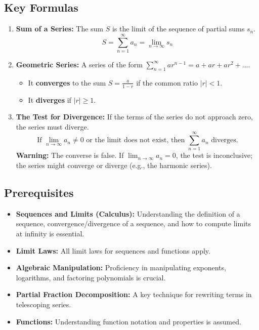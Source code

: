 \documentclass{article}
\begin{document}
\subsection{Key Formulas}
\begin{enumerate}
    \item \textbf{Sum of a Series:} The sum $S$ is the limit of the sequence of partial sums $s_n$.
    \[ S = \sum_{n=1}^{\infty} a_n = \lim_{n \to \infty} s_n \]
    \item \textbf{Geometric Series:} A series of the form $\sum_{n=1}^{\infty} ar^{n-1} = a + ar + ar^2 + \dots$.
    \begin{itemize}
        \item It \textbf{converges} to the sum $S = \frac{a}{1-r}$ if the common ratio $|r| < 1$.
        \item It \textbf{diverges} if $|r| \ge 1$.
    \end{itemize}
    \item \textbf{The Test for Divergence:} If the terms of the series do not approach zero, the series must diverge.
    \[ \text{If } \lim_{n \to \infty} a_n \neq 0 \text{ or the limit does not exist, then } \sum_{n=1}^{\infty} a_n \text{ diverges.} \]
    \textbf{Warning:} The converse is false. If $\lim_{n \to \infty} a_n = 0$, the test is inconclusive; the series might converge or diverge (e.g., the harmonic series).
\end{enumerate}

\subsection{Prerequisites}
\begin{itemize}
    \item \textbf{Sequences and Limits (Calculus):} Understanding the definition of a sequence, convergence/divergence of a sequence, and how to compute limits at infinity is essential.
    \item \textbf{Limit Laws:} All limit laws for sequences and functions apply.
    \item \textbf{Algebraic Manipulation:} Proficiency in manipulating exponents, logarithms, and factoring polynomials is crucial.
    \item \textbf{Partial Fraction Decomposition:} A key technique for rewriting terms in telescoping series.
    \item \textbf{Functions:} Understanding function notation and properties is assumed.
\end{itemize}
\end{document}
